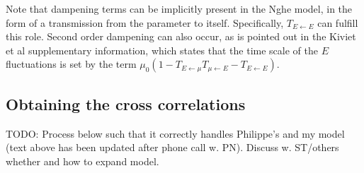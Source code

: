 %
%
%
%

Note that dampening terms can be implicitly present in the Nghe model, in the form of a transmission from the parameter to itself.
Specifically, $T_{E \leftarrow E}$ can fulfill this role. %
Second order dampening can also occur, 
as is pointed out in the Kiviet et al supplementary information, which states that the time scale of the $E$ fluctuations is set by the term $\mu_0(1-T_{E \leftarrow \mu}T_{\mu \leftarrow E}-T_{E \leftarrow E})$.





\subsection*{Obtaining the cross correlations}

{\color{red}TODO: Process below such that it correctly handles Philippe's and my model (text above has been updated after phone call w. PN). Discuss w. ST/others whether and how to expand model.}

